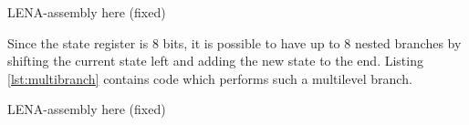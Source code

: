 {\sc \color{green} LENA-assembly here (fixed)}

Since the state register is 8 bits, it is possible to have up to 8 nested
branches by shifting the current state left and adding the new state to the
end. Listing \ref{lst:multibranch} contains code which performs such a
multilevel branch.

{\sc \color{green} LENA-assembly here (fixed)}
